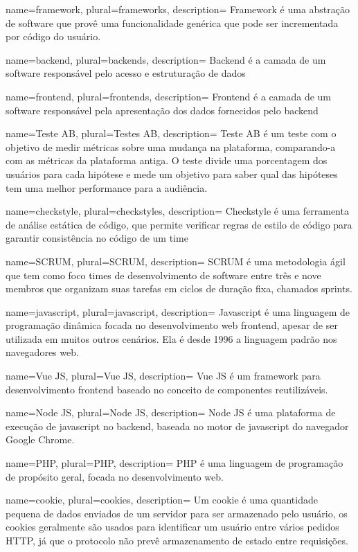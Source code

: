 {
  name=framework,
  plural=frameworks,
  description={
    Framework é uma abstração de software que provê uma funcionalidade genérica que pode ser incrementada por código do usuário.
  }
}

{
  name=backend,
  plural=backends,
  description={
    Backend é a camada de um software responsável pelo acesso e estruturação de dados
  }
}

{
  name=frontend,
  plural=frontends,
  description={
    Frontend é a camada de um software responsável pela apresentação dos dados fornecidos pelo \gls{backend}
  }
}

{
  name=Teste AB,
  plural=Testes AB,
  description={
    Teste AB é um teste com o objetivo de medir métricas sobre uma mudança na plataforma, comparando-a com as métricas da plataforma antiga. O teste divide uma porcentagem dos usuários para cada hipótese e mede um objetivo para saber qual das hipóteses tem uma melhor performance para a audiência.
  }
}

{
  name=checkstyle,
  plural=checkstyles,
  description={
    Checkstyle é uma ferramenta de análise estática de código, que permite verificar regras de estilo de código para garantir consistência no código de um time
  }
}

{
  name=SCRUM,
  plural=SCRUM,
  description={
    SCRUM é uma metodologia ágil que tem como foco times de desenvolvimento de software entre três e nove membros que organizam suas tarefas em ciclos de duração fixa, chamados sprints.
  }
}

{
  name=javascript,
  plural=javascript,
  description={
    Javascript é uma linguagem de programação dinâmica focada no desenvolvimento web \gls{frontend}, apesar de ser utilizada em muitos outros cenários. Ela é desde 1996 a linguagem padrão nos navegadores web.
  }
}

{
  name=Vue JS,
  plural=Vue JS,
  description={
    Vue JS é um \gls{framework} para desenvolvimento \gls{frontend} baseado no conceito de componentes reutilizáveis.
  }
}

{
  name=Node JS,
  plural=Node JS,
  description={
    Node JS é uma plataforma de execução de \gls{javascript} no \gls{backend}, baseada no motor de \gls{javascript} do navegador Google Chrome.
  }
}

{
  name=PHP,
  plural=PHP,
  description={
    PHP é uma linguagem de programação de propósito geral, focada no desenvolvimento web.
  }
}

{
  name=cookie,
  plural=cookies,
  description={
   Um cookie é uma quantidade pequena de dados enviados de um servidor para ser armazenado pelo usuário, os cookies geralmente são usados para identificar um usuário entre vários pedidos \gls{HTTP}, já que o protocolo não prevê armazenamento de estado entre requisições.
  }
}
